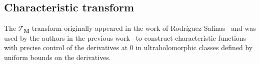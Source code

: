 \documentclass[11pt,a4paper]{article}
\theoremstyle{plain}
\theoremstyle{definition}
\newcommand{\M}{\mathbf{M}}
\newcommand{\LL}{\mathbf{L}}
\begin{document}
\subsection{Characteristic transform}\label{ssect.CharactTransf}
% 
% 
The $\mathcal{T}_{\M}$ transform originally appeared in the work of Rodríguez Salinas~\cite{salinas62} and was used by the authors in the previous work~\cite{ultraholomstab} to construct characteristic functions with precise control of the derivatives at $0$ in ultraholomorphic classes defined by uniform bounds on the derivatives.
\end{document}
